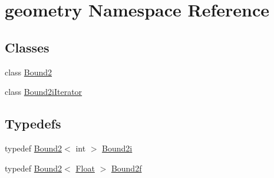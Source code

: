 \hypertarget{namespacegeometry}{}\section{geometry Namespace Reference}
\label{namespacegeometry}
\subsection*{Classes}
\begin{DoxyCompactItemize}
\item 
class \mbox{\hyperlink{classgeometry_1_1Bound2}{Bound2}}
\item 
class \mbox{\hyperlink{classgeometry_1_1Bound2iIterator}{Bound2i\+Iterator}}
\end{DoxyCompactItemize}
\subsection*{Typedefs}
\begin{DoxyCompactItemize}
\item 
typedef \mbox{\hyperlink{classgeometry_1_1Bound2}{Bound2}}$<$ int $>$ \mbox{\hyperlink{namespacegeometry_a918a919c0a947983a121b11e5c64934f}{Bound2i}}
\item 
typedef \mbox{\hyperlink{classgeometry_1_1Bound2}{Bound2}}$<$ \mbox{\hyperlink{cyclop_8hpp_a07afd7094cb489cbd514c76e6f55d34f}{Float}} $>$ \mbox{\hyperlink{namespacegeometry_ac3fecada9e2f601d3fbf32fd5962858f}{Bound2f}}
\end{DoxyCompactItemize}
